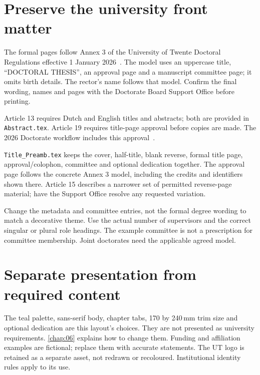 
\section{Preserve the university front matter}
The formal pages follow Annex 3 of the University of Twente Doctoral Regulations
effective 1 January 2026~\cite{ut2026}. The model uses an uppercase title,
``DOCTORAL THESIS'', an approval page and a manuscript committee page; it omits
birth details. The rector's name follows that model. Confirm the final wording,
names and pages with the Doctorate Board Support Office before printing.

Article 13 requires Dutch and English titles and abstracts; both are provided
in \texttt{Abstract.tex}. Article 19 requires title-page approval before copies
are made. The 2026 Doctorate workflow includes this approval~\cite{utDoctorate}.

\texttt{Title\_Preamb.tex} keeps the cover, half-title, blank reverse, formal
title page, approval/colophon, committee and optional dedication together.
The approval page follows the concrete Annex 3 model, including the credits
and identifiers shown there. Article 15 describes a narrower set of permitted
reverse-page material; have the Support Office resolve any requested variation.

Change the metadata and committee entries, not the formal degree wording to
match a decorative theme. Use the actual number of supervisors and the correct
singular or plural role headings. The example committee is not a prescription
for committee membership. Joint doctorates need the applicable agreed model.

\section{Separate presentation from required content}
The teal palette, sans-serif body, chapter tabs, 170 by 240\,mm trim size and
optional dedication are this layout's choices. They are not presented as
university requirements. \autoref{chap:06} explains how to change them.
Funding and affiliation examples are fictional; replace them with accurate
statements. The UT logo is retained as a separate asset, not redrawn or
recoloured. Institutional identity rules apply to its use.
